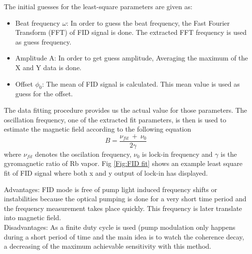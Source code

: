 The initial guesses for the least-square parameters are given
as:
\begin{itemize}
\item
Beat frequency $\omega$: In order to guess the beat frequency, the Fast Fourier Transform (FFT) of FID signal is done. The extracted FFT frequency is used as guess frequency.
\item
Amplitude A: In order to get guess amplitude, Averaging the maximum of the X and Y data is done.
\item
Offset $\phi_0$: The mean of FID signal is calculated. This mean value is used as guess for the offset. 

\end{itemize}
The data fitting procedure provides us the actual value for those parameters. The oscillation frequency, one of the extracted fit parameters, is then is used to estimate the magnetic field according to the following equation
\begin{equation}
 B= \frac{\nu_{fit}~ +~\nu_0}{2\gamma}\label{eq:field}
\end{equation}
 where $\nu_{fit}$ denotes the oscilation  frequency, $\nu_{0}$ is lock-in frequency and $\gamma$ is the gyromagnetic ratio of Rb vapor. Fig \ref{Fig:FID fit} shows an example least square fit of FID signal where both x and y output of lock-in has displayed.
 
Advantages: FID mode is free of  pump light induced frequency shifts or instabilities because the optical pumping is done for a very short time period and the frequency measurement takes place quickly. This frequency is later translate into magnetic field.\\ 

Disadvantages: As a finite duty cycle is used (pump modulation only happens during a short period of time and the main idea is to watch the coherence decay, a decreasing of the maximum achievable sensitivity with this method.



